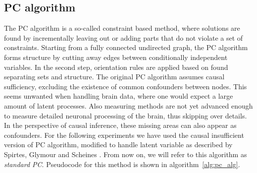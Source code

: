 \documentclass[a4paper, 10pt, english, onecolumn]{article}
\begin{document}
\subsection{PC algorithm}
The PC algorithm is a so-called constraint based method, where solutions are found by incrementally leaving out or adding parts that do not violate a set of constraints.
Starting from a fully connected undirected graph, the PC algorithm forms structure by cutting away edges between conditionally independent variables.
In the second step, orientation rules are applied based on found separating sets and structure.
The original PC algorithm assumes causal sufficiency, excluding the existence of common confounders between nodes.
This seems unwanted when handling brain data, where one would expect a large amount of latent processes.
Also measuring methods are not yet advanced enough to measure detailed neuronal processing of the brain, thus skipping over details.
In the perspective of causal inference, these missing areas can also appear as confounders.
For the following experiments we have used the causal insufficient version of PC algorithm, modified to handle latent variable as described by Spirtes, Glymour and Scheines \cite[p.165-167]{spirtes2000}.
From now on, we will refer to this algorithm as \textit{standard PC}.
Pseudocode for this method is shown in algorithm~\ref{alg:pc_alg}.
\end{document}
